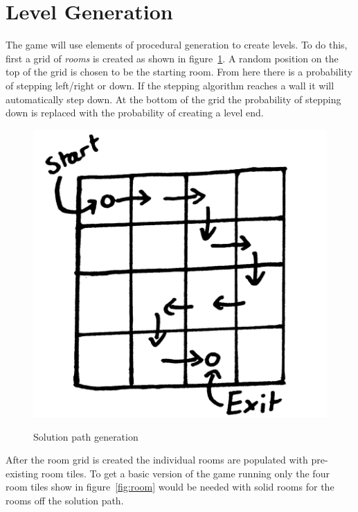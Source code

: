 
\section{Level Generation}

The game will use elements of procedural generation to create levels. To do this, first a grid of \textit{rooms} is created as shown in figure~\ref{fig:grid}. A random position on the top of the grid is chosen to be the starting room. From here there is a probability of stepping left/right or down. If the stepping algorithm reaches a wall it will automatically step down. At the bottom of the grid the probability of stepping down is replaced with the probability of creating a level end.

\begin{figure}[ht]
\centering
\includegraphics[scale=0.2, trim = 0cm 0cm 0cm 0cm]{images/4x4}
\label{fig:grid}
\caption{Solution path generation}
\end{figure}

After the room grid is created the individual rooms are populated with pre-existing room tiles. To get a basic version of the game running only the four room tiles show in figure~\ref{fig:room} would be needed with solid rooms for the rooms off the solution path.

